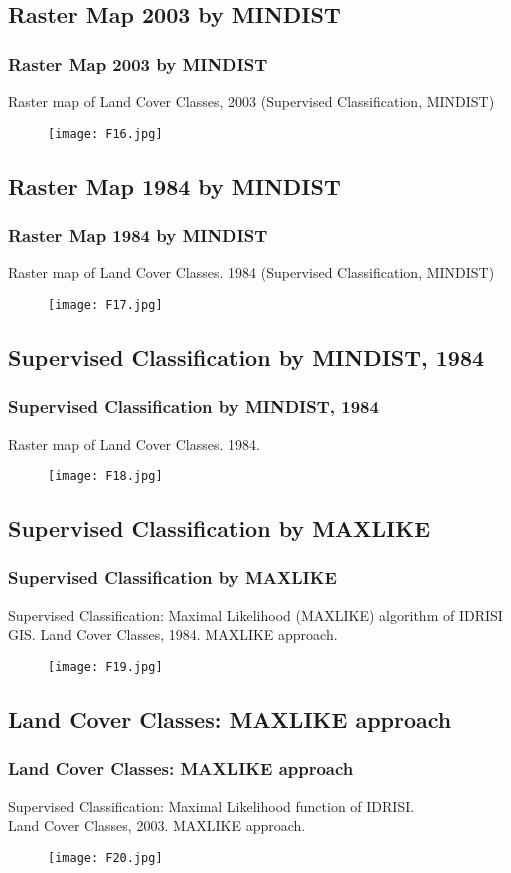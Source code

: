 \documentclass[pdflatex,compress,8pt,
	xcolor={dvipsnames,dvipsnames,svgnames,x11names,table},
	hyperref={
	breaklinks = true, 
	pdfauthor={Lemenkova Polina}, 
	pdfsubject={Preentation}, 
	pdfcreator={Lemenkova Polina}, 
	pdfproducer={Lemenkova Polina}, 
	citecolor=NavyBlue, 
	urlbordercolor=cyan,
	urlcolor = NavyBlue, 
	breaklinks = true}]{beamer}
\begin{document}
\subsection{Raster Map 2003 by MINDIST}
\begin{frame}\frametitle{Raster Map 2003 by MINDIST}
Raster map of Land Cover Classes, 2003 (Supervised Classification, MINDIST)
\begin{figure}[H]
	\centering
		\texttt{[image: F16.jpg]}
\end{figure}
\end{frame}

\subsection{Raster Map 1984 by MINDIST}
\begin{frame}\frametitle{Raster Map 1984 by MINDIST}
Raster map of Land Cover Classes. 1984 (Supervised Classification, MINDIST)
\begin{figure}[H]
	\centering
		\texttt{[image: F17.jpg]}
\end{figure}
\end{frame}

\subsection{Supervised Classification by MINDIST, 1984}
\begin{frame}\frametitle{Supervised Classification by MINDIST, 1984}
Raster map of Land Cover Classes. 1984.
\begin{figure}[H]
	\centering
		\texttt{[image: F18.jpg]}
\end{figure}
\end{frame}

\subsection{Supervised Classification by MAXLIKE}
\begin{frame}\frametitle{Supervised Classification by MAXLIKE}
Supervised Classification:  Maximal Likelihood (MAXLIKE) algorithm of IDRISI GIS.
Land Cover Classes, 1984. MAXLIKE approach.
\begin{figure}[H]
	\centering
		\texttt{[image: F19.jpg]}
\end{figure}
\end{frame}

\subsection{Land Cover Classes: MAXLIKE approach}
\begin{frame}\frametitle{Land Cover Classes: MAXLIKE approach}
Supervised Classification: Maximal Likelihood function of IDRISI.\\
Land Cover Classes, 2003. MAXLIKE approach.
\begin{figure}[H]
	\centering
		\texttt{[image: F20.jpg]}
\end{figure}
\end{frame}
\end{document}
